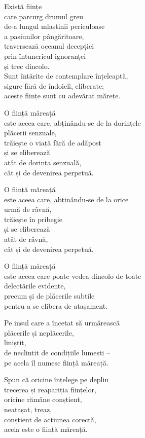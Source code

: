 Există ființe\\
care parcurg drumul greu\\
de-a lungul mlaștinii periculoase\\
a pasiunilor pângăritoare,\\
traversează oceanul decepției\\
prin întunericul ignoranței\\
și trec dincolo.\\
Sunt întărite de contemplare înțeleaptă,\\
sigure fără de îndoieli, eliberate;\\
aceste ființe sunt cu adevărat mărețe.


O ființă măreață\\
este aceea care, abținându-se de la dorințele\\
plăcerii senzuale,\\
trăiește o viață fără de adăpost\\
și se eliberează\\
atât de dorința senzuală,\\
cât și de devenirea perpetuă.


O ființă măreață\\
este aceea care, abținându-se de la orice\\
urmă de râvnă,\\
trăiește în pribegie\\
și se eliberează\\
atât de râvnă,\\
cât și de devenirea perpetuă.


O ființă măreață\\
este aceea care poate vedea dincolo de toate\\
delectările evidente,\\
precum și de plăcerile subtile\\
pentru a se elibera de atașament.


Pe insul care a încetat să urmărească\\
plăcerile și neplăcerile,\\
liniștit,\\
de neclintit de condițiile lumești –\\
pe acela îl numesc ființă măreață.


Spun că oricine înțelege pe deplin\\
trecerea și reapariția ființelor,\\
oricine rămâne conștient,\\
neatașat, treaz,\\
conștient de acțiunea corectă,\\
acela este o ființă măreață.


